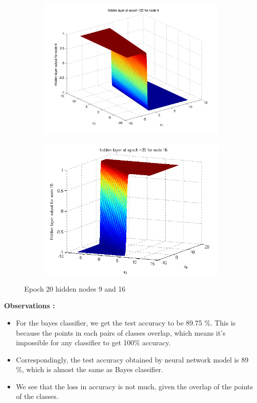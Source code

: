 \documentclass{article}
\begin{document}
\begin{figure}
\begin{subfigure}{.5\textwidth}
  \centering
  \includegraphics[width=.8\linewidth]{Classification/overlapping/h20_9}
 
\end{subfigure}%
\begin{subfigure}{.5\textwidth}
  \centering
  \includegraphics[width=.8\linewidth]{Classification/overlapping/h20_16}
  \end{subfigure}
\caption{Epoch 20 hidden nodes 9 and 16}
\end{figure}

\textbf{Observations :}
\begin{itemize}
\item For the bayes classifier, we get the test accuracy to be 89.75 \%. This is because the points in each pairs of classes overlap, which means it's impossible for any classifier to get 100\% accuracy.
\item Correspondingly, the test accuracy obtained by neural network model is 89 \%, which is almost the same as Bayes classifier.
\item We see that the loss in accuracy is not much, given the overlap of the points of the classes.
\end{itemize}
\end{document}
